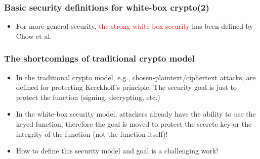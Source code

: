 \documentclass{beamer}
\begin{document}
\frame
{
\frametitle{Basic security definitions for white-box crypto(2)}
\begin{itemize}
\item For more general security, \textcolor{red}{the strong white-box security} has been defined by Chow et al.
\end{itemize}

\begin{center}
\end{center}
}

\frame
{
\frametitle{The shortcomings of traditional crypto model}
\begin{itemize}
 \setlength{\itemsep}{12pt}

 \item In the traditional crypto model, e.g., chosen-plaintext/ciphertext attacks, are defined for protecting Kerckhoff's principle. The security goal is just to
 protect the function (signing, decrypting, etc.)

 \item In the white-box security model, attackers already have the ability to use the keyed function, therefore the goal is moved to protect the secrete key or the integrity of the function (not the function itself)!

 \item How to define this security model and goal is a challenging work!

\end{itemize}

}
\end{document}
